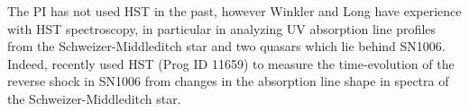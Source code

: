 \documentclass[12pt]{article}
\begin{document}
%
%
%
\pasthstusage  %
The PI has not used HST in the past, however Winkler and Long have experience with HST spectroscopy, in particular in analyzing UV absorption line profiles from the Schweizer-Middleditch star and two quasars which lie behind SN1006.  Indeed, \citet{2011ApJ...742...80W} recently used HST (Prog ID 11659) to measure the  time-evolution of the reverse shock in SN1006 from changes in the absorption line shape in spectra  of the Schweizer-Middleditch star. %


\renewcommand\baselinestretch{0.97}
\newpage
{\small


}
\end{document}
